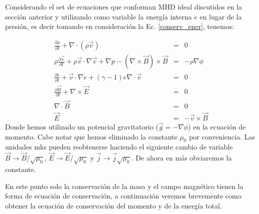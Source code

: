 \documentclass[a4paper,11pt]{report}
\begin{document}
Considerando el set de ecuaciones que conforman MHD ideal discutidos en la sección anterior y utilizando como variable la energía interna $e$ en lugar de la presión, es decir tomando en consideración la Ec. \ref{conserv_ener}, tenemos:

\begin{eqnarray}
\frac{\partial \rho}{\partial t} +\nabla \cdot (\rho \vec{v}) &=& 0 \label{mhd1}\\
\rho \frac{\partial\vec{v}}{\partial t} + \rho \vec{v} \cdot \nabla  \vec{v} +\nabla p - (\nabla \times \vec{B}) \times \vec{B} &=& -\rho \nabla \phi \label{momento2} \\
\frac{\partial e}{\partial t} + \vec{v}\cdot \nabla e +(\gamma -1)e\nabla \cdot \vec{v} &=& 0 \label{ener_int} \\
\frac{\partial \vec{B}}{\partial t} + \nabla \times \vec{E} &=& 0  \label{fara_1}\\
\nabla \cdot \vec{B} &=& 0 \\
\vec{E} &=& -\vec{v}\times \vec{B} \label{mhd6} 
\end{eqnarray}
Donde hemos utilizado un potencial gravitatorio ($\vec{g}=-\nabla \phi$) en la ecuación de momento. Cabe notar que hemos eliminado la constante $\mu_0$ por conveniencia. Las unidades mks pueden reobtenerse haciendo el siguiente cambio de variable $\vec{B}\rightarrow \vec{B}/\sqrt{\mu_0}$, $\vec{E}\rightarrow \vec{E}/\sqrt{\mu_0}$ y $\vec{j}\rightarrow \vec{j}\sqrt{\mu_0}$. De ahora en más obviaremos la constante.

En este punto solo la conservación de la masa y el campo magnético tienen la forma de ecuación de conservación, a continuación veremos brevemente como obtener la ecuación de conservación del momento y de la energía total.
\end{document}
